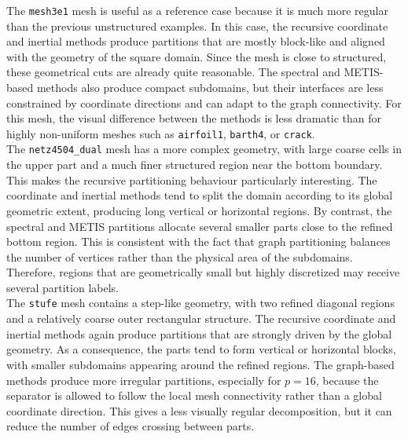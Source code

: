 \documentclass[unicode,10pt,a4paper,oneside,numbers=endperiod,openany]{scrartcl}
\begin{document}
The \texttt{mesh3e1} mesh is useful as a reference case because it is much more regular than the
previous unstructured examples. In this case, the recursive coordinate and inertial methods produce
partitions that are mostly block-like and aligned with the geometry of the square domain. Since the
mesh is close to structured, these geometrical cuts are already quite reasonable. The spectral and
METIS-based methods also produce compact subdomains, but their interfaces are less constrained by
coordinate directions and can adapt to the graph connectivity. For this mesh, the visual difference
between the methods is less dramatic than for highly non-uniform meshes such as \texttt{airfoil1},
\texttt{barth4}, or \texttt{crack}.\\

The \texttt{netz4504\_dual} mesh has a more complex geometry, with large coarse cells in the upper
part and a much finer structured region near the bottom boundary. This makes the recursive
partitioning behaviour particularly interesting. The coordinate and inertial methods tend to split
the domain according to its global geometric extent, producing long vertical or horizontal regions.
By contrast, the spectral and METIS partitions allocate several smaller parts close to the refined
bottom region. This is consistent with the fact that graph partitioning balances the number of
vertices rather than the physical area of the subdomains. Therefore, regions that are geometrically
small but highly discretized may receive several partition labels.\\

The \texttt{stufe} mesh contains a step-like geometry, with two refined diagonal regions and
a relatively coarse outer rectangular structure. The recursive coordinate and inertial methods
again produce partitions that are strongly driven by the global geometry. As a consequence,
the parts tend to form vertical or horizontal blocks, with smaller subdomains appearing around
the refined regions. The graph-based methods produce more irregular partitions, especially for
\(p=16\), because the separator is allowed to follow the local mesh connectivity rather than a
global coordinate direction. This gives a less visually regular decomposition, but it can reduce
the number of edges crossing between parts.\\
\end{document}
